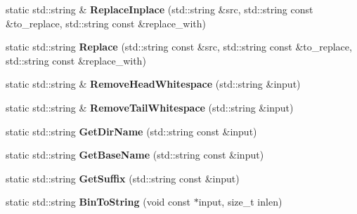 \begin{DoxyCompactItemize}
\item 
\hypertarget{classlsf_1_1util_1_1StringExt_a39efda3173dd7874db13cd8c4ac31b46}{
static std::string \& {\bfseries ReplaceInplace} (std::string \&src, std::string const \&to\_\-replace, std::string const \&replace\_\-with)}
\label{classlsf_1_1util_1_1StringExt_a39efda3173dd7874db13cd8c4ac31b46}

\item 
\hypertarget{classlsf_1_1util_1_1StringExt_af01a9b0e334605e12ac7fa2dbc179a6b}{
static std::string {\bfseries Replace} (std::string const \&src, std::string const \&to\_\-replace, std::string const \&replace\_\-with)}
\label{classlsf_1_1util_1_1StringExt_af01a9b0e334605e12ac7fa2dbc179a6b}

\item 
\hypertarget{classlsf_1_1util_1_1StringExt_ab34e6c6e36796a5394d5df1d1b2c5855}{
static std::string \& {\bfseries RemoveHeadWhitespace} (std::string \&input)}
\label{classlsf_1_1util_1_1StringExt_ab34e6c6e36796a5394d5df1d1b2c5855}

\item 
\hypertarget{classlsf_1_1util_1_1StringExt_aef8d13e267b90b0f6cc1e425724aff6c}{
static std::string \& {\bfseries RemoveTailWhitespace} (std::string \&input)}
\label{classlsf_1_1util_1_1StringExt_aef8d13e267b90b0f6cc1e425724aff6c}

\item 
\hypertarget{classlsf_1_1util_1_1StringExt_afb948b221029c5aa30c0b4b0880add6d}{
static std::string {\bfseries GetDirName} (std::string const \&input)}
\label{classlsf_1_1util_1_1StringExt_afb948b221029c5aa30c0b4b0880add6d}

\item 
\hypertarget{classlsf_1_1util_1_1StringExt_abf68e2952c513f8d92689edb3172264a}{
static std::string {\bfseries GetBaseName} (std::string const \&input)}
\label{classlsf_1_1util_1_1StringExt_abf68e2952c513f8d92689edb3172264a}

\item 
\hypertarget{classlsf_1_1util_1_1StringExt_aad58a5c479fe26b2ff96aaf850930555}{
static std::string {\bfseries GetSuffix} (std::string const \&input)}
\label{classlsf_1_1util_1_1StringExt_aad58a5c479fe26b2ff96aaf850930555}

\item 
\hypertarget{classlsf_1_1util_1_1StringExt_a2e4b54b6c060655c9d8e50178e6d3e8a}{
static std::string {\bfseries BinToString} (void const $\ast$input, size\_\-t inlen)}
\label{classlsf_1_1util_1_1StringExt_a2e4b54b6c060655c9d8e50178e6d3e8a}


\end{DoxyCompactItemize}
